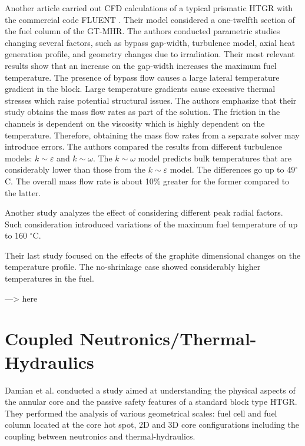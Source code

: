 \documentclass[11pt,letterpaper]{article}
\begin{document}
Another article \cite{sato_computational_2010} carried out \gls{CFD} calculations of a typical prismatic \gls{HTGR} with the commercial code FLUENT \cite{fluent_inc_fluent_2006}.
Their model considered a one-twelfth section of the fuel column of the GT-MHR.
The authors conducted parametric studies changing several factors, such as bypass gap-width, turbulence model, axial heat generation profile, and geometry changes due to irradiation.
Their most relevant results show that an increase on the gap-width increases the maximum fuel temperature.
The presence of bypass flow causes a large lateral temperature gradient in the block.
Large temperature gradients cause excessive thermal stresses which raise potential structural issues.
The authors emphasize that their study obtains the mass flow rates as part of the solution.
The friction in the channels is dependent on the viscosity which is highly dependent on the temperature.
Therefore, obtaining the mass flow rates from a separate solver may introduce errors.
The authors compared the results from different turbulence models: $k \sim \varepsilon$ and $k \sim \omega$.
The $k \sim \omega$ model predicts bulk temperatures that are considerably lower than those from the $k \sim \varepsilon$ model.
The differences go up to 49$^{\circ}$C.
The overall mass flow rate is about 10$\%$ greater for the former  compared to the latter.

Another study analyzes the effect of considering different peak radial factors. Such consideration introduced variations of the maximum fuel temperature of up to 160 $^{\circ}$C.

Their last study focused on the effects of the graphite dimensional changes on the temperature profile.
The no-shrinkage case showed considerably higher temperatures in the fuel.






---> here





\section{Coupled Neutronics/Thermal-Hydraulics}

Damian et al. \cite{damian_vhtr_2008} conducted a study aimed at understanding the physical aspects of the annular core and the passive safety features of a standard block type \gls{HTGR}.
They performed the analysis of various geometrical scales: fuel cell and fuel column located at the core hot spot, 2D and 3D core configurations including the coupling between neutronics and thermal-hydraulics.
\end{document}
